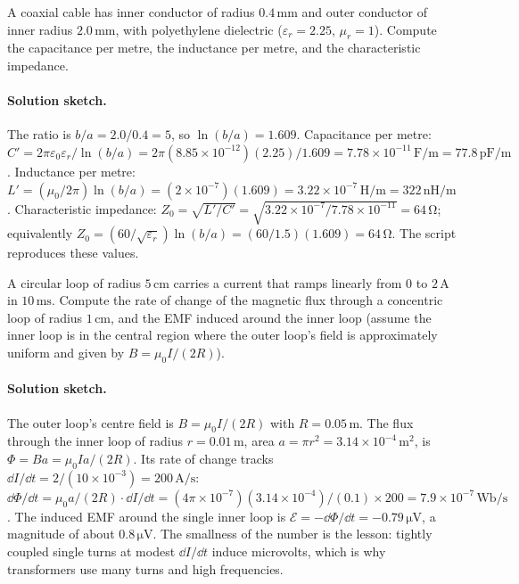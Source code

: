 \begin{exercise}
A coaxial cable has inner conductor of radius $0.4\,\si{\milli\meter}$
and outer conductor of inner radius $2.0\,\si{\milli\meter}$, with
polyethylene dielectric ($\varepsilon_{r} = 2.25$, $\mu_{r} = 1$).
Compute the capacitance per metre, the inductance per metre, and the
characteristic impedance.

\paragraph{Solution sketch.} The ratio is $b/a = 2.0/0.4 = 5$, so
$\ln(b/a) = 1.609$. Capacitance per metre: $C' = 2\pi\varepsilon_0
\varepsilon_r/\ln(b/a) = 2\pi(8.85\times 10^{-12})(2.25)/1.609 =
7.78\times 10^{-11}\,\si{\farad\per\meter} = 77.8\,\si{\pico\farad\per
\meter}$. Inductance per metre: $L' = (\mu_0/2\pi)\ln(b/a) = (2\times
10^{-7})(1.609) = 3.22\times 10^{-7}\,\si{\henry\per\meter} = 322\,\si{
\nano\henry\per\meter}$. Characteristic impedance: $Z_0 = \sqrt{L'/C'}
= \sqrt{3.22\times 10^{-7}/7.78\times 10^{-11}} = 64\,\si{\ohm}$;
equivalently $Z_0 = (60/\sqrt{\varepsilon_r})\ln(b/a) = (60/1.5)(1.609)
= 64\,\si{\ohm}$. The script 
reproduces these values.
\end{exercise}

\begin{exercise}
A circular loop of radius $5\,\si{\centi\meter}$ carries a current that
ramps linearly from $0$ to $2\,\si{\ampere}$ in $10\,\si{\milli\second}$.
Compute the rate of change of the magnetic flux through a concentric
loop of radius $1\,\si{\centi\meter}$, and the EMF induced around the
inner loop (assume the inner loop is in the central region where the
outer loop's field is approximately uniform and given by $B =
\mu_{0}I/(2R)$).

\paragraph{Solution sketch.} The outer loop's centre field is $B =
\mu_0 I/(2R)$ with $R = 0.05\,\si{\meter}$. The flux through the inner
loop of radius $r = 0.01\,\si{\meter}$, area $a = \pi r^2 = 3.14\times
10^{-4}\,\si{\meter\squared}$, is $\Phi = Ba = \mu_0 I a/(2R)$. Its
rate of change tracks $\dd I/\dd t = 2/(10\times 10^{-3}) = 200\,\si{
\ampere\per\second}$: $\dd\Phi/\dd t = \mu_0 a/(2R)\cdot\dd I/\dd t =
(4\pi\times 10^{-7})(3.14\times 10^{-4})/(0.1)\times 200 = 7.9\times
10^{-7}\,\si{\weber\per\second}$. The induced EMF around the single
inner loop is $\mathcal{E} = -\dd\Phi/\dd t = -0.79\,\si{\micro\volt}$,
a magnitude of about $0.8\,\si{\micro\volt}$. The smallness of the
number is the lesson: tightly coupled single turns at modest $\dd I/
\dd t$ induce microvolts, which is why transformers use many turns and
high frequencies.
\end{exercise}

